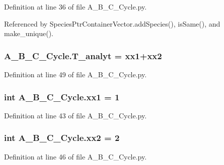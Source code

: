 Definition at line 36 of file A\+\_\+\+B\+\_\+\+C\+\_\+\+Cycle.\+py.



Referenced by Species\+Ptr\+Container\+Vector.\+add\+Species(), is\+Same(), and make\+\_\+unique().

\hypertarget{namespaceA__B__C__Cycle_a36440b61a4f8a38a160c7d71c35e0af3}{
\subsubsection[{T\+\_\+analyt}]{\setlength{\rightskip}{0pt plus 5cm}A\+\_\+\+B\+\_\+\+C\+\_\+\+Cycle.\+T\+\_\+analyt = {\bf xx1}+{\bf xx2}}}\label{namespaceA__B__C__Cycle_a36440b61a4f8a38a160c7d71c35e0af3}


Definition at line 49 of file A\+\_\+\+B\+\_\+\+C\+\_\+\+Cycle.\+py.

\hypertarget{namespaceA__B__C__Cycle_ada302b2e3d775f1258d503301d1c2377}{
\subsubsection[{xx1}]{\setlength{\rightskip}{0pt plus 5cm}int A\+\_\+\+B\+\_\+\+C\+\_\+\+Cycle.\+xx1 = 1}}\label{namespaceA__B__C__Cycle_ada302b2e3d775f1258d503301d1c2377}


Definition at line 43 of file A\+\_\+\+B\+\_\+\+C\+\_\+\+Cycle.\+py.

\hypertarget{namespaceA__B__C__Cycle_a9a299d8ac16b9cdc11b6643776732552}{
\subsubsection[{xx2}]{\setlength{\rightskip}{0pt plus 5cm}int A\+\_\+\+B\+\_\+\+C\+\_\+\+Cycle.\+xx2 = 2}}\label{namespaceA__B__C__Cycle_a9a299d8ac16b9cdc11b6643776732552}


Definition at line 46 of file A\+\_\+\+B\+\_\+\+C\+\_\+\+Cycle.\+py.

